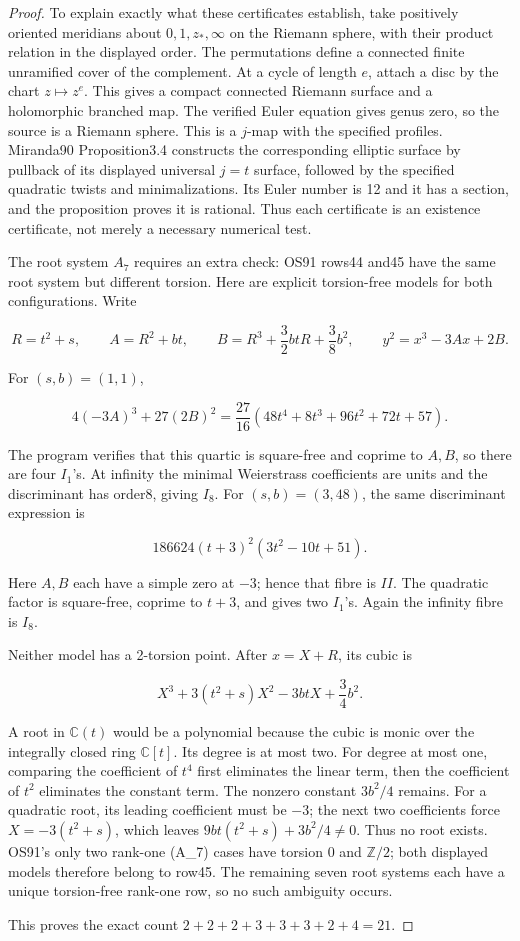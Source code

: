 \begin{proof}
To explain exactly what these certificates establish, take positively oriented meridians about \(0,1,z_*,\infty\) on the Riemann sphere, with their product relation in the displayed order. The permutations define a connected finite unramified cover of the complement. At a cycle of length \(e\), attach a disc by the chart \(z\mapsto z^e\). This gives a compact connected Riemann surface and a holomorphic branched map. The verified Euler equation gives genus zero, so the source is a Riemann sphere. This is a \(j\)-map with the specified profiles. Miranda90 Proposition3.4 constructs the corresponding elliptic surface by pullback of its displayed universal \(j=t\) surface, followed by the specified quadratic twists and minimalizations. Its Euler number is 12 and it has a section, and the proposition proves it is rational. Thus each certificate is an existence certificate, not merely a necessary numerical test.

The root system \(A_7\) requires an extra check: OS91 rows44 and45 have the same root system but different torsion. Here are explicit torsion-free models for both configurations. Write

\[
 R=t^2+s,\qquad A=R^2+bt,\qquad
 B=R^3+\frac32btR+\frac38b^2,
 \qquad y^2=x^3-3Ax+2B.
\]

For \((s,b)=(1,1)\),

\[
 4(-3A)^3+27(2B)^2
 =\frac{27}{16}(48t^4+8t^3+96t^2+72t+57).
\]

The program verifies that this quartic is square-free and coprime to \(A,B\), so there are four \(I_1\)'s. At infinity the minimal Weierstrass coefficients are units and the discriminant has order8, giving \(I_8\). For \((s,b)=(3,48)\), the same discriminant expression is

\[
 186624(t+3)^2(3t^2-10t+51).
\]

Here \(A,B\) each have a simple zero at \(-3\); hence that fibre is \(II\). The quadratic factor is square-free, coprime to \(t+3\), and gives two \(I_1\)'s. Again the infinity fibre is \(I_8\).

Neither model has a 2-torsion point. After \(x=X+R\), its cubic is

\[
 X^3+3(t^2+s)X^2-3btX+\frac34b^2.
\]

A root in \(\mathbb C(t)\) would be a polynomial because the cubic is monic over the integrally closed ring \(\mathbb C[t]\). Its degree is at most two. For degree at most one, comparing the coefficient of \(t^4\) first eliminates the linear term, then the coefficient of \(t^2\) eliminates the constant term. The nonzero constant \(3b^2/4\) remains. For a quadratic root, its leading coefficient must be \(-3\); the next two coefficients force \(X=-3(t^2+s)\), which leaves \(9bt(t^2+s)+3b^2/4\ne0\). Thus no root exists. OS91's only two rank-one (A\_7) cases have torsion 0 and \(\mathbb Z/2\); both displayed models therefore belong to row45. The remaining seven root systems each have a unique torsion-free rank-one row, so no such ambiguity occurs.

This proves the exact count \(2+2+2+3+3+3+2+4=21\).
\end{proof}
